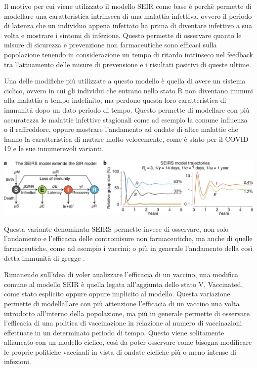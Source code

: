 Il motivo per cui viene utilizzato il modello SEIR come base è perchè permette di 
modellare una caratteristica intrinseca di una malattia infettiva, ovvero 
il periodo di latenza che un individuo appena infettato ha prima di diventare 
infettivo a sua volta e mostrare i sintomi di infezione. Questo permette 
di osservare quanto le misure di sicurezza e prevenzione non farmaceutiche 
sono efficaci sulla popolazione tenendo in considerazione 
un tempo di ritardo intrinseco nel feedback tra l'attuamento delle 
misure di prevensione e i risultati positivi di queste ultime.

Una delle modifiche più utilizzate a questo modello è quella di avere un sistema 
ciclico, ovvero in cui gli individui che entrano nello stato R non diventano immuni 
alla malattia a tempo indefinito, ma perdono questa loro caratteristica di immunità
dopo un dato periodo di tempo. Questo permette di modellare con più accuratezza le malattie
infettive stagionali come ad esempio la comune influenza o il raffreddore, oppure 
mostrare l'andamento ad ondate di altre malattie che hanno la caratteristica di 
mutare molto velocemente, come è stato per il COVID-19 e le sue innumerevoli varianti.

\begin{minipage}{\linewidth}
    \centering
    \includegraphics[width=\textwidth]{img/41592_2020_856_Fig1_HTML.png}
    \label{fig:SEIRS_model}
\end{minipage}

Questa variante denominata SEIRS permette invece di osservare, non solo l'andamento e 
l'efficacia delle contromisure non farmaceutiche, ma anche di quelle
farmaceutiche, come ad esempio i vaccini; o più in generale l'andamento
della così detta immunità di gregge \cite{Bjornstad2020}. 

Rimanendo sull'idea di voler analizzare l'efficacia di un vaccino, una
modifica comune al modello SEIR è quella legata all'aggiunta dello stato V,
Vaccinated, come stato esplicito oppure oppure implicito al modello. Questa 
variazione permette di modellallare con più attenzione l'efficacia di un 
vaccino una volta introdotto all'interno della popolazione, 
ma più in generale permette di osservare l'efficacia di una politica di vaccinazione 
in relazione al numero di vaccinazioni effettuate in un determinato periodo di tempo.
Questo viene solitamente affiancato con un modello ciclico, così da poter
osservare come bisogna modificare le proprie politiche vaccinali in vista
di ondate cicliche più o meno intense di infezioni.

